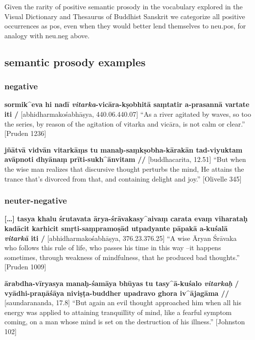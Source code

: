 \documentclass[
  letterpaper,
  DIV=11,
  numbers=noendperiod,
  oneside]{scrreprt}
\begin{document}
Given the rarity of positive semantic prosody in the vocabulary explored
in the Visual Dictionary and Thesaurus of Buddhist Sanskrit we
categorize all positive occurrences as pos, even when they would better
lend themselves to neu.pos, for analogy with neu.neg above.

\hypertarget{semantic-prosody-examples-1}{%
\subsection{semantic prosody
examples}\label{semantic-prosody-examples-1}}

\hypertarget{negative}{%
\subsubsection{negative}\label{negative}}

\textbf{sormik\^{}eva hi nadī \emph{vitarka}-vicāra-kṣobhitā saṃtatir
a-prasannā vartate iti /} {[}abhidharmakośabhāṣya, 440.06.440.07{]} ``As
a river agitated by waves, so too the series, by reason of the agitation
of vitarka and vicāra, is not calm or clear.'' {[}Pruden 1236{]}

\textbf{jñātvā vidvān vitarkāṃs tu manaḥ-saṃkṣobha-kārakān tad-viyuktam
avāpnoti dhyānaṃ prīti-sukh\^{}ānvitam //} {[}buddhacarita, 12.51{]}
``But when the wise man realizes that discursive thought perturbs the
mind, He attains the trance that's divorced from that, and containing
delight and joy.'' {[}Olivelle 345{]}

\hypertarget{neuter-negative}{%
\subsubsection{neuter-negative}\label{neuter-negative}}

\textbf{{[}\ldots{]} tasya khalu śrutavata ārya-śrāvakasy\^{}aivaṃ
carata evaṃ viharataḥ kadācit karhicit smṛti-saṃpramoṣād utpadyante
pāpakā a-kuśalā \emph{vitarkā} iti /} {[}abhidharmakośabhāṣya,
376.23.376.25{]} ``A wise Āryan Śrāvaka who follows this rule of life,
who passes his time in this way --it happens sometimes, through weakness
of mindfulness, that he produced bad thoughts.'' {[}Pruden 1009{]}

\textbf{ārabdha-vīryasya manaḥ-śamāya bhūyas tu tasy\^{}ā-kuśalo
\emph{vitarkaḥ} / vyādhi-praṇāśāya niviṣṭa-buddher upadravo ghora
iv\^{}ājagāma //} {[}saundarananda, 17.8{]} ``But again an evil thought
approached him when all his energy was applied to attaining tranquillity
of mind, like a fearful symptom coming, on a man whose mind is set on
the destruction of his illness.'' {[}Johnston 102{]}
\end{document}
